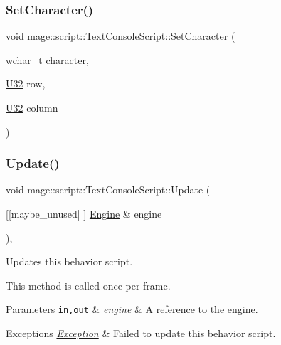 \subsubsection{\texorpdfstring{Set\+Character()}{SetCharacter()}}
{\footnotesize\ttfamily void mage\+::script\+::\+Text\+Console\+Script\+::\+Set\+Character (\begin{DoxyParamCaption}\item[{wchar\+\_\+t}]{character,  }\item[{\mbox{\hyperlink{namespacemage_aa5d6eaabaac3cdd01873d6a3d27e90f3}{U32}}}]{row,  }\item[{\mbox{\hyperlink{namespacemage_aa5d6eaabaac3cdd01873d6a3d27e90f3}{U32}}}]{column }\end{DoxyParamCaption})\hspace{0.3cm}{\ttfamily [private]}}

\mbox{\label{classmage_1_1script_1_1_text_console_script_ad619f93a946660b30f5e39821778f7b0}} 
\subsubsection{\texorpdfstring{Update()}{Update()}}
{\footnotesize\ttfamily void mage\+::script\+::\+Text\+Console\+Script\+::\+Update (\begin{DoxyParamCaption}\item[{\mbox{[}\mbox{[}maybe\+\_\+unused\mbox{]} \mbox{]} \mbox{\hyperlink{classmage_1_1_engine}{Engine}} \&}]{engine }\end{DoxyParamCaption})\hspace{0.3cm}{\ttfamily [override]}, {\ttfamily [virtual]}}

Updates this behavior script.

This method is called once per frame.


\begin{DoxyParams}[1]{Parameters}
\mbox{\tt in,out}  & {\em engine} & A reference to the engine. \\
\hline
\end{DoxyParams}

\begin{DoxyExceptions}{Exceptions}
{\em \mbox{\hyperlink{classmage_1_1_exception}{Exception}}} & Failed to update this behavior script. \\
\hline
\end{DoxyExceptions}


